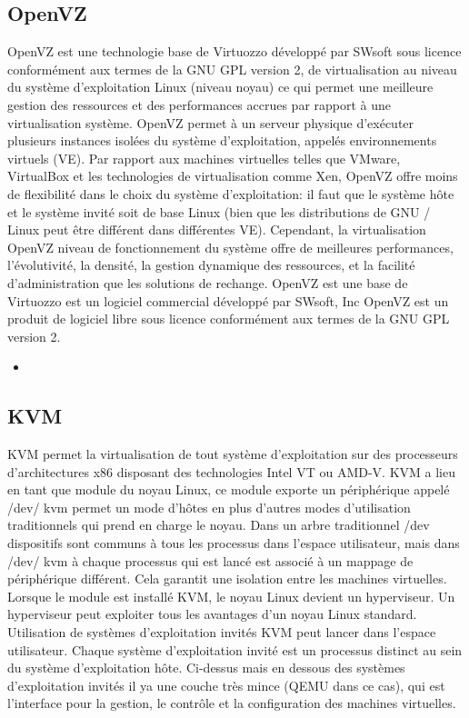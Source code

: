 \documentclass[a4paper,11pt]{report}
\begin{document}
\subsection{OpenVZ}
OpenVZ est une technologie base de Virtuozzo développé par SWsoft sous licence conformément aux termes de la GNU GPL version 2, de virtualisation au niveau du système d'exploitation Linux (niveau noyau) ce qui permet une meilleure gestion des ressources et des performances accrues par rapport à une virtualisation système. OpenVZ permet à un serveur physique d'exécuter plusieurs instances isolées du système d'exploitation, appelés environnements virtuels (VE).
Par rapport aux machines virtuelles telles que VMware, VirtualBox et les technologies de virtualisation comme Xen, OpenVZ offre moins de flexibilité dans le choix du système d'exploitation: il faut que le système hôte et le système invité soit de base Linux (bien que les distributions de GNU / Linux peut être différent dans différentes VE). Cependant, la virtualisation OpenVZ niveau de fonctionnement du système offre de meilleures performances, l'évolutivité, la densité, la gestion dynamique des ressources, et la facilité d'administration que les solutions de rechange.
OpenVZ est une base de Virtuozzo est un logiciel commercial développé par SWsoft, Inc OpenVZ est un produit de logiciel libre sous licence conformément aux termes de la GNU GPL version 2. 
\begin{itemize}
  \item 
\end{itemize}

\subsection{KVM}
KVM permet la virtualisation de tout système d'exploitation sur des processeurs d'architectures x86 disposant des technologies Intel VT ou AMD-V.
KVM a lieu en tant que module du noyau Linux, ce module exporte un périphérique appelé /dev/ kvm permet un mode d'hôtes en plus d'autres modes d'utilisation traditionnels qui prend en charge le noyau. Dans un arbre traditionnel /dev dispositifs sont communs à tous les processus dans l'espace utilisateur, mais dans /dev/ kvm à chaque processus qui est lancé est associé à un mappage de périphérique différent.
Cela garantit une isolation entre les machines virtuelles. Lorsque le module est installé KVM, le noyau Linux devient un hyperviseur. Un hyperviseur peut exploiter tous les avantages d'un noyau Linux standard.
Utilisation de systèmes d'exploitation invités KVM peut lancer dans l'espace utilisateur. Chaque système d'exploitation invité est un processus distinct au sein du système d'exploitation hôte. Ci-dessus mais en dessous des systèmes d'exploitation invités il ya une couche très mince (QEMU dans ce cas), qui est l'interface pour la gestion, le contrôle et la configuration des machines virtuelles.
\end{document}
